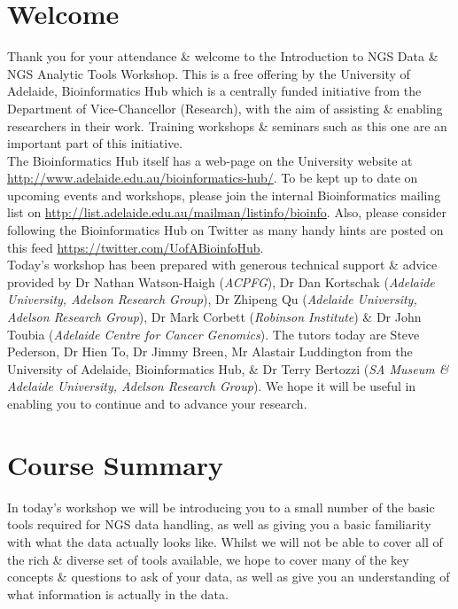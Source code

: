 %
%
\newpage
\section{Welcome}
Thank you for your attendance \& welcome to the Introduction to NGS Data \& NGS Analytic Tools Workshop.
This is a free offering by the University of Adelaide, Bioinformatics Hub which is a centrally funded initiative from the Department of Vice-Chancellor (Research), with the aim of assisting \& enabling researchers in their work.
Training workshops \& seminars such as this one  are an important part of this initiative. \\

The Bioinformatics Hub itself has a web-page on the University website at \url{http://www.adelaide.edu.au/bioinformatics-hub/}.
To be kept up to date on upcoming events and workshops, please join the internal Bioinformatics mailing list on \url{http://list.adelaide.edu.au/mailman/listinfo/bioinfo}.
Also, please consider following the Bioinformatics Hub on Twitter as many handy hints are posted on this feed \url{https://twitter.com/UofABioinfoHub}.\\

Today's workshop has been prepared with generous technical support \& advice provided by Dr Nathan Watson-Haigh (\textit{ACPFG}), Dr Dan Kortschak (\textit{Adelaide University, Adelson Research Group}), Dr Zhipeng Qu (\textit{Adelaide University, Adelson Research Group}), Dr Mark Corbett (\textit{Robinson Institute}) \& Dr John Toubia (\textit{Adelaide Centre for Cancer Genomics}).
The tutors today are Steve Pederson, Dr Hien To, Dr Jimmy Breen, Mr Alastair Luddington from the University of Adelaide, Bioinformatics Hub, \& Dr Terry Bertozzi (\textit{SA Museum \& Adelaide University, Adelson Research Group}). 
We hope it will be useful in enabling you to continue and to advance your research.\\

\section{Course Summary}
In today's workshop we will be introducing you to a small number of the basic tools required for NGS data handling, as well as giving you a basic familiarity with what the data actually looks like.
Whilst we will not be able to cover all of the rich \& diverse set of tools available, we hope to cover many of the key concepts \& questions to ask of your data, as well as give you an understanding of what information is actually in the data.\\

